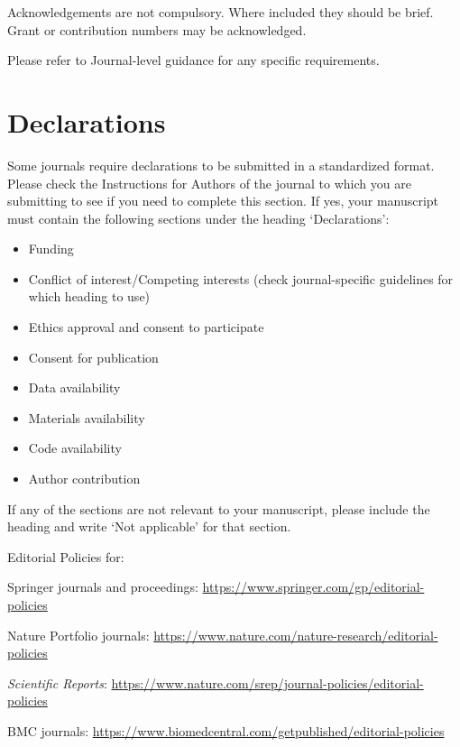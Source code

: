 \documentclass[pdflatex,sn-mathphys-num]{sn-jnl}%
\theoremstyle{thmstyleone}%
\theoremstyle{thmstyletwo}%
\theoremstyle{thmstylethree}%
\begin{document}

Acknowledgements are not compulsory. Where included they should be brief. Grant or contribution numbers may be acknowledged.

Please refer to Journal-level guidance for any specific requirements.

\section*{Declarations}

Some journals require declarations to be submitted in a standardized format. Please check the Instructions for Authors of the journal to which you are submitting to see if you need to complete this section. If yes, your manuscript must contain the following sections under the heading `Declarations':

\begin{itemize}
\item Funding
\item Conflict of interest/Competing interests (check journal-specific guidelines for which heading to use)
\item Ethics approval and consent to participate
\item Consent for publication
\item Data availability 
\item Materials availability
\item Code availability 
\item Author contribution
\end{itemize}

\noindent
If any of the sections are not relevant to your manuscript, please include the heading and write `Not applicable' for that section. 

\bigskip
\begin{flushleft}%
Editorial Policies for:

\bigskip\noindent
Springer journals and proceedings: \url{https://www.springer.com/gp/editorial-policies}

\bigskip\noindent
Nature Portfolio journals: \url{https://www.nature.com/nature-research/editorial-policies}

\bigskip\noindent
\textit{Scientific Reports}: \url{https://www.nature.com/srep/journal-policies/editorial-policies}

\bigskip\noindent
BMC journals: \url{https://www.biomedcentral.com/getpublished/editorial-policies}
\end{flushleft}
\end{document}
